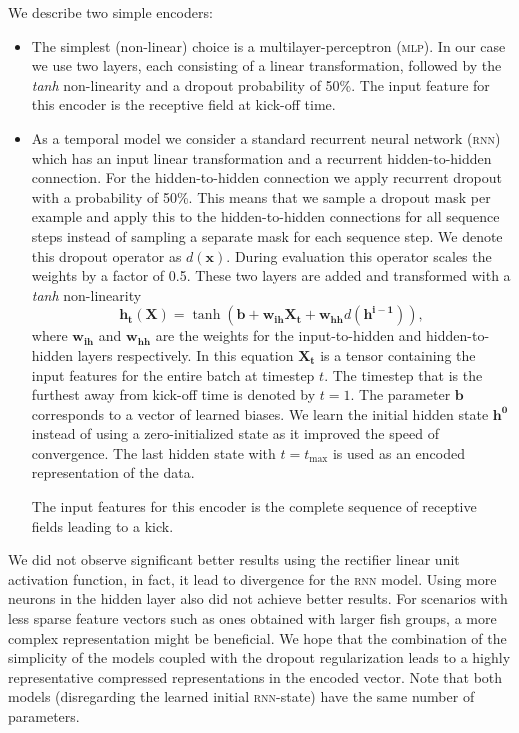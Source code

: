 \documentclass[nobib, a4paper]{tufte-handout}
\begin{document}
We describe two simple encoders:
\begin{itemize}
\item The simplest (non-linear) choice is a multilayer-perceptron (\textsc{mlp}).
  In our case we use two layers, each consisting of a linear transformation, followed by the \textit{tanh} non-linearity and a dropout probability of 50\%\autocite{dropout}.
  The input feature for this encoder is the receptive field at kick-off time.
\item
  As a temporal model we consider a standard recurrent neural network (\textsc{rnn}) which has an input linear transformation and a recurrent hidden-to-hidden connection.
  For the hidden-to-hidden connection we apply recurrent dropout with a probability of 50\%\autocite{recurrentDropout}.
  This means that we sample a dropout mask per example and apply this to the hidden-to-hidden connections for all sequence steps instead of sampling a separate mask for each sequence step.
  We denote this dropout operator as \(d(\bm{x})\).
  During evaluation this operator scales the weights by a factor of 0.5.
  These two layers are added and transformed with a \textit{tanh} non-linearity
  \begin{equation*}
    \bm{h_t} (\bm{X}) = \operatorname{tanh} \left( \bm{b} + \bm{w_{ih}} \bm{X_t} + \bm{w_{hh}} d (\bm{h^{i-1}}) \right),
  \end{equation*}
  where \(\bm{w_{ih}}\) and \(\bm{w_{hh}}\) are the weights for the input-to-hidden and hidden-to-hidden layers respectively.
  In this equation $\bm{X_t}$ is a tensor containing the input features for the entire batch at timestep \(t\).
  The timestep that is the furthest away from kick-off time is denoted by $t = 1$.
  The parameter \(\bm{b}\) corresponds to a vector of learned biases.
  We learn the initial hidden state \(\bm{h^0}\) instead of using a zero-initialized state as it improved the speed of convergence.
  The last hidden state with \(t = t_\text{max}\) is used as an encoded representation of the data.

  The input features for this encoder is the complete sequence of receptive fields leading to a kick.%
\end{itemize}
We did not observe significant better results using the rectifier linear unit activation function, in fact, it lead to divergence for the \textsc{rnn} model.
Using more neurons in the hidden layer also did not achieve better results.
For scenarios with less sparse feature vectors such as ones obtained with larger fish groups, a more complex representation might be beneficial.
We hope that the combination of the simplicity of the models coupled with the dropout regularization leads to a highly representative compressed representations in the encoded vector.
Note that both models (disregarding the learned initial \textsc{rnn}-state) have the same number of parameters.
\end{document}
